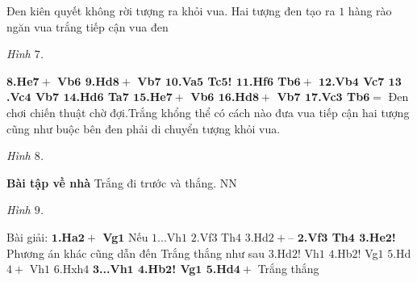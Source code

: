 \begin{multicols}{2}
	\vskip 0.1cm 
	Đen kiên quyết không rời tượng ra khỏi vua. Hai tượng đen tạo ra $1$ hàng rào ngăn vua trắng tiếp cận vua đen 
	\begin{center}
		\newgame
		\scalebox{0.95}\showboard
		\vskip 0.1cm
		\textit{\small\color{gocco}Hình $7$.}
	\end{center}
	$\pmb{8}$\textbf{\color{gocco}.He$\pmb{7+}$ Vb$\pmb{6}$ $\pmb{9}$.Hd$\pmb{8+}$ Vb$\pmb{7}$ $\pmb{10}$.Va$\pmb{5}$ Tc$\pmb{5}$! $\pmb{11}$.Hf$\pmb{6}$ Tb$\pmb{6+}$ $\pmb{12}$.Vb$\pmb{4}$ Vc$\pmb{7}$
	\vskip 0.1cm 
	$\pmb{13}$.Vc$\pmb{4}$ Vb$\pmb{7}$ $\pmb{14}$.Hd$\pmb{6}$ Ta$\pmb{7}$ $\pmb{15}$.He$\pmb{7+}$ Vb$\pmb{6}$ $\pmb{16}$.Hd$\pmb{8+}$ Vb$\pmb{7}$ $\pmb{17}$.Vc$\pmb{3}$ Tb}$\pmb{6=}$ 
	\vskip 0.1cm
	Đen chơi chiến thuật chờ đợi.Trắng khổng thể có cách nào đưa vua tiếp cận hai tượng cũng như buộc bên đen phải di chuyển tượng khỏi vua. 
	\begin{center}
		\newgame
		\scalebox{0.95}\showboard
		\vskip 0.1cm
		\textit{\small\color{gocco}Hình $8$.}
	\end{center}
	\textbf{\color{gocco}Bài tập về nhà}
	\vskip 0.1cm
	Trắng đi trước và thắng. NN
	\begin{center}
		\newgame
		\scalebox{0.95}\showboard
		\vskip 0.1cm
		\textit{\small\color{gocco}Hình $9$.}
	\end{center}
	Bài giải:
	\vskip 0.1cm
	$\pmb{1}$\textbf{\color{gocco}.Ha$\pmb{2+}$ Vg}$\pmb{1}$ Nếu $1$...Vh$1$ $2$.Vf$3$ Th$4$ $3$.Hd$2+–$
	\vskip 0.1cm
	$\pmb{2}$\textbf{\color{gocco}.Vf$\pmb{3}$ Th$\pmb{4}$ $\pmb{3}$.He$\pmb{2}$!} Phương án khác cũng dẫn đến Trắng thắng như sau $3$.Hd$2$! Vh$1$ $4$.Hb$2$! Vg$1$ $5$.Hd$4+$ Vh$1$ $6$.Hxh$4$
	\vskip 0.1cm
	$\pmb{3}$\textbf{\color{gocco}...Vh$\pmb{1}$ $\pmb{4}$.Hb$\pmb{2}$! Vg$\pmb{1}$ $\pmb{5}$.Hd}$\pmb{4+}$ Trắng thắng
\end{multicols}




